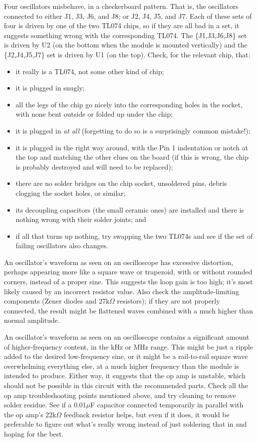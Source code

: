 Four oscillators misbehave, in a checkerboard pattern.  That is, the
oscillators connected to either J1, J3, J6, and J8; or J2, J4, J5, and J7. 
Each of these sets of four is driven by one of the two TL074 chips, so if
they are all bad in a set, it suggests something wrong with the
corresponding TL074.  The \{J1,J3,J6,J8\} set is driven by U2 (on the bottom
when the module is mounted vertically) and the \{J2,J4,J5,J7\} set is
driven by U1 (on the top).  Check, for the relevant chip, that:
\begin{itemize}
  \item it really is a TL074, not some other kind of chip;
  \item it is plugged in snugly;
  \item all the legs of the chip go nicely into the corresponding holes in
    the socket, with none bent outside or folded up under the chip;
  \item it is plugged in \emph{at all} (forgetting to do so is a surprisingly
    common mistake!);
  \item it is plugged in the right way around, with the Pin 1
    indentation or notch at the top and matching the other clues on the
    board (if this is wrong, the chip is probably destroyed and will need to
    be replaced);
  \item there are no solder bridges on the chip socket, unsoldered pins,
    debris clogging the socket holes, or similar;
  \item its decoupling capacitors (the small ceramic ones) are installed and
    there is nothing wrong with their solder joints; and
  \item if all that turns up nothing, try swapping the two TL074s and see if
    the set of failing oscillators also changes.
\end{itemize}

An oscillator's waveform as seen on an oscilloscope has excessive
distortion, perhaps appearing more like a square wave or trapezoid, with or
without rounded corners, instead of a proper sine.  This suggests the loop
gain is too high; it's most likely caused by an incorrect resistor value. 
Also check the amplitude-limiting components (Zener diodes and 27k$\Omega$
resistors); if they are not properly connected, the result might be
flattened waves combined with a much higher than normal amplitude.

An oscillator's waveform as seen on an oscilloscope contains a significant
amount of higher-frequency content, in the kHz or MHz range.  This might be
just a ripple added to the desired low-frequency sine, or it might be a
rail-to-rail square wave overwhelming everything else, at a much higher
frequency than the module is intended to produce.  Either way, it suggests
that the op amp is unstable, which should not be possible in this circuit
with the recommended parts.  Check all the op amp troubleshooting points
mentioned above, and try cleaning to remove solder residue.  See if a
0.01$\mu$F capacitor connected temporarily in parallel with the op amp's
22k$\Omega$ feedback resistor helps, but even if it does, it would be
preferable to figure out what's really wrong instead of just soldering that
in and hoping for the best.

